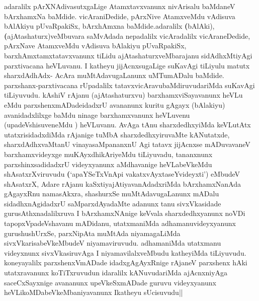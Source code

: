 \begin{artha}
adaralilx pArXNAdivasutxgaLige Atamxtavxvanunx nivArisalu baMdaneV
bArxhamxNa baMdide. vicAraniDedide, pArxNive AtamxveMdu vAdisuva
bAlAkiyu pUvaRpakiSx, bArxhAmxna baMdide.adaralilx
\textbf(bAlAki),\textbf(ajAtashaturx)veMbuvara saMvAdada nepadalilx
vicAradalilx vicAraneDedide, pArxNave AtamxveMdu vAdisuva bAlakiyu
pUvaRpakiSx, barxhAmxtamxtatavxvanunx tiLidu ajAtashaturxveMbarajanu
sidAdhxMtiyAgi parxtivacana heVLuvanu. I katheyu jijAcnxsugaLige
suKavAgi tiLiyulu matutx sharxdAdhAdx- AcAra muMtAdavugaLanunx
uMTumADalu baMdide. parxshanx-parxtivacana rUpadalilx
tatavxvicAravubaMdiruvudariMda suKavAgi tiLiyuvudu. kAshiV rAjanu
(ajAtashaturxvu) barxhamxviSayavanunx heVLu eMdu
parxshenxmADadeidadxrU avananunx kuritu gAgayx (bAlakiyu)
avanidadxlilxge baMdu ninage barxhamxvanunx heVLuvenu
(upadeVshisuveneMdu ) heVLuvanu. AvAga tAnu sharxdedhxyiMda 
keVLutAtx utatxrisidadxdiMda rAjanige tuMbA sharxdedhxyiruvaMte
kANutatxde, sharxdAdhxvaMtanU vinayasaMpananxnU Agi tatavx jijAcnxse
mADuvavaneV barxhamxvideyxge muKAyxdhikAriyeMdu tiLiyuvadu, tananxnunx
parxshinxsadidadxrU videyxyanunx aMdhavanige heVLabeVkeMdu
shAsatxrXviruvudu \textbf(`apaYSeTxVnApi vakatxvAyxtaseYvideyxti')
eMbudeV shAsatxrX, Adare rAjanu kaSxtiyajAtiyavanAdadxriMda
bArxhamxNanAda gAgayxRnu namasAkxra, shashurxSe muMtAdavugaLanunx
mADalu sidadhxnAgidadxrU saMparxdAyadaMte adanunx tanu sivxVkasidade
gurusAthxnadalilxruva I bArxhamxNAnige keVvala sharxdedhxyanunx noVDi
tapopxVpadeVshavanu mADidanu, utatxmaniMda adhamanuvideyxyanunx
gurushushUrxSe, parxNipAta muMtAda niyamagaLiMda
sivxVkarisabeVkeMbudeV niyamaviruvudu. adhamaniMda utatxmanu
videyxnunx sivxVkasiruvAga I niyamavilalxveMbudu katheyiMda
tiLiyuvudu. koneyayalilx parxshenxVmADade idadxgAgAyxRnige rAjaneV
parxshenx hAki utatxravanunx koTiTxruvudun idaralilx kANuvudariMda
ajAcnxniyAga saceCxSayxnige avananunx upeVkeSxmADade guruvu
videyxyanunx heVLikoMDabeVkeMbaniyavanunx Ikatheyu
sUcisuvudu||
\end{artha}

